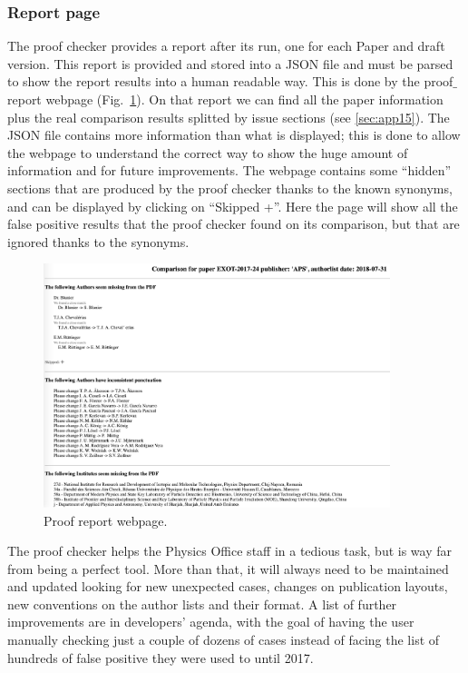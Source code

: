 \subsubsection{Report page}
\label{sec:Report_page}
The proof checker provides a report after its run, one for each Paper and draft version. This report is provided and stored into a JSON file and must be parsed to show the report results into a human readable way. This is done by the proof$\_$report webpage (Fig.~\ref{fig:proof_report_webpage}).
On that report we can find all the paper information plus the real comparison results splitted by issue sections (see \ref{sec:app15}). The JSON file contains more information than what is displayed; this is done to allow the webpage to understand the correct way to show the huge amount of information and for future improvements. The webpage contains some “hidden” sections that are produced by the proof checker thanks to the known synonyms, and can be displayed by clicking on “Skipped +”. Here the page will show all the false positive results that the proof checker found on its comparison, but that are ignored thanks to the synonyms.
\begin{figure}[ht!]
  \centering
  \includegraphics[width=0.9\textwidth]{figures/proof_report_webpage.png}
  \caption{Proof report webpage.}
  \label{fig:proof_report_webpage}
\end{figure}
The proof checker helps the Physics Office staff in a tedious task, but is way far from being a perfect tool. More than that, it will always need to be maintained and updated looking for new unexpected cases, changes on publication layouts, new conventions on the author lists and their format. A list of further improvements are in developers’ agenda, with the goal of having the user manually checking just a couple of dozens of cases instead of facing the list of hundreds of false positive they were used to until 2017.     
